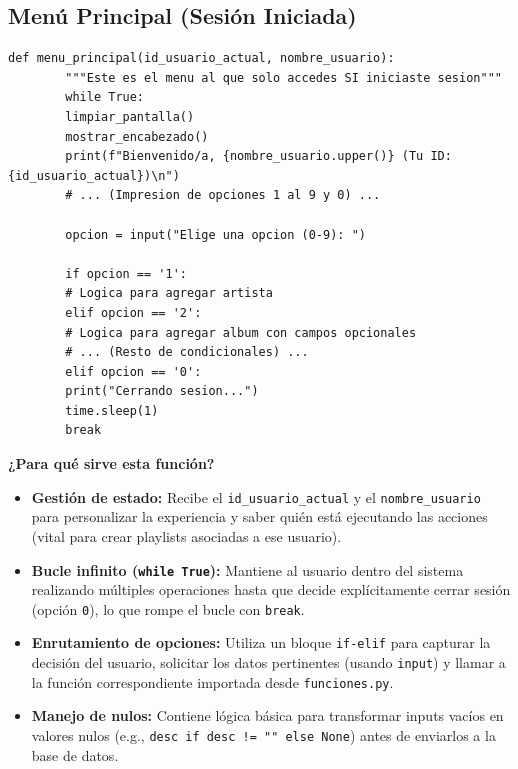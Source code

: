 \documentclass[11pt]{article}
\begin{document}
	\subsection{Menú Principal (Sesión Iniciada)}
	\begin{lstlisting}[style=pythonstyle]
		def menu_principal(id_usuario_actual, nombre_usuario):
		"""Este es el menu al que solo accedes SI iniciaste sesion"""
		while True:
		limpiar_pantalla()
		mostrar_encabezado()
		print(f"Bienvenido/a, {nombre_usuario.upper()} (Tu ID: {id_usuario_actual})\n")
		# ... (Impresion de opciones 1 al 9 y 0) ...
		
		opcion = input("Elige una opcion (0-9): ")
		
		if opcion == '1':
		# Logica para agregar artista
		elif opcion == '2':
		# Logica para agregar album con campos opcionales
		# ... (Resto de condicionales) ...
		elif opcion == '0':
		print("Cerrando sesion...")
		time.sleep(1)
		break 
	\end{lstlisting}
	
	\noindent\textbf{¿Para qué sirve esta función?}
	\begin{itemize}[noitemsep,topsep=2pt]
		\item \textbf{Gestión de estado:} Recibe el \texttt{id\_usuario\_actual} y el \texttt{nombre\_usuario} para personalizar la experiencia y saber quién está ejecutando las acciones (vital para crear playlists asociadas a ese usuario).
		\item \textbf{Bucle infinito (\texttt{while True}):} Mantiene al usuario dentro del sistema realizando múltiples operaciones hasta que decide explícitamente cerrar sesión (opción \texttt{0}), lo que rompe el bucle con \texttt{break}.
		\item \textbf{Enrutamiento de opciones:} Utiliza un bloque \texttt{if-elif} para capturar la decisión del usuario, solicitar los datos pertinentes (usando \texttt{input}) y llamar a la función correspondiente importada desde \texttt{funciones.py}.
		\item \textbf{Manejo de nulos:} Contiene lógica básica para transformar inputs vacíos en valores nulos (e.g., \texttt{desc if desc != "" else None}) antes de enviarlos a la base de datos.
	\end{itemize}
	
	\vspace{0.5cm}
	
\end{document}
